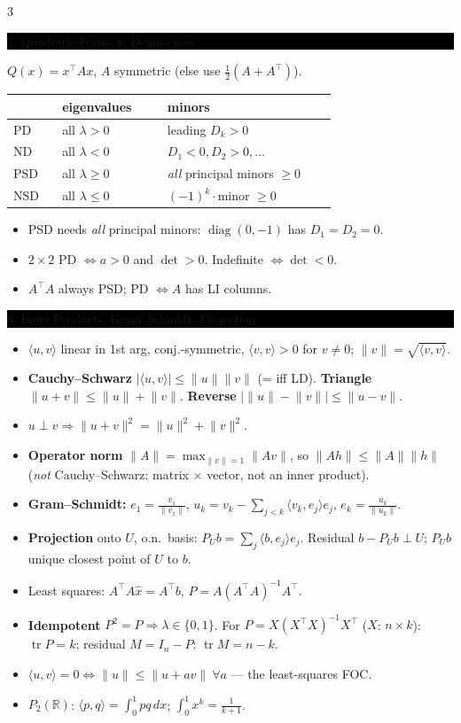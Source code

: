 \documentclass[8pt,letterpaper]{article}
\makeatletter
\newcommand{\sect}[1]{%
  \vspace{2.2pt}%
  \noindent\colorbox{black}{\parbox{\dimexpr\linewidth-2\fboxsep}{%
    \color{white}\bfseries\scshape\fontsize{6.4}{7.4}\selectfont
    \hyphenpenalty=10000\exhyphenpenalty=10000\raggedright #1}}%
  \vspace{1.4pt}\par\nopagebreak\@afterheading}
\newenvironment{tl}
  {\begin{itemize}[leftmargin=6pt,itemsep=0.3pt,topsep=1pt,parsep=0pt,
                   partopsep=0pt,label=\textcolor{gray}{\tiny$\bullet$}]}
  {\end{itemize}}
\newcommand{\R}{\mathbb{R}}
\newcommand{\tr}{\operatorname{tr}}
\newcommand{\tp}{^{\!\top}}
\newcommand{\ip}[2]{\langle #1,#2\rangle}
\newcommand{\nm}[1]{\lVert #1\rVert}
\makeatother
\begin{document}
\begin{multicols}{3}
\sect{5. Quadratic Forms \& Definiteness}
$Q(x)=x\tp Ax$, $A$ symmetric (else use $\tfrac12(A+A\tp)$).
\begin{center}\fontsize{5.9}{6.8}\selectfont
\begin{tabular}{@{}p{0.13\linewidth}p{0.28\linewidth}p{0.45\linewidth}@{}}
\hline
 & eigenvalues & minors\\ \hline
PD & all $\lambda>0$ & leading $D_k>0$\\
ND & all $\lambda<0$ & $D_1<0,D_2>0,\dots$\\
PSD & all $\lambda\ge0$ & \emph{all} principal minors $\ge0$\\
NSD & all $\lambda\le0$ & $(-1)^k\cdot$minor $\ge0$\\ \hline
\end{tabular}
\end{center}
\begin{tl}
\item \colorbox{black!12}{PSD needs \emph{all} principal minors}: $\operatorname{diag}(0,-1)$ has $D_1=D_2=0$.
\item $2\times2$ PD $\iff a>0$ and $\det>0$. Indefinite $\iff\det<0$.
\item $A\tp A$ always PSD; PD $\iff A$ has LI columns.
\end{tl}

\sect{6. Inner Products, Gram--Schmidt, Projection}
\begin{tl}
\item $\ip{u}{v}$ linear in 1st arg, conj.-symmetric, $\ip{v}{v}>0$ for $v\neq0$; $\nm{v}=\sqrt{\ip{v}{v}}$.
\item \textbf{Cauchy--Schwarz} $|\ip{u}{v}|\le\nm{u}\nm{v}$ (= iff LD). \textbf{Triangle} $\nm{u+v}\le\nm{u}+\nm{v}$. \textbf{Reverse} $\big|\nm{u}-\nm{v}\big|\le\nm{u-v}$.
\item $u\perp v\Rightarrow\nm{u+v}^2=\nm{u}^2+\nm{v}^2$.
\item \textbf{Operator norm} $\nm{A}=\max_{\nm{v}=1}\nm{Av}$, so $\nm{Ah}\le\nm{A}\nm{h}$ (\emph{not} Cauchy--Schwarz: matrix $\times$ vector, not an inner product).
\item \textbf{Gram--Schmidt:} $e_1=\frac{v_1}{\nm{v_1}}$, $u_k=v_k-\sum_{j<k}\ip{v_k}{e_j}e_j$, $e_k=\frac{u_k}{\nm{u_k}}$.
\item \textbf{Projection} onto $U$, o.n.\ basis: $P_Ub=\sum_j\ip{b}{e_j}e_j$. Residual $b-P_Ub\perp U$; $P_Ub$ unique closest point of $U$ to $b$.
\item Least squares: $A\tp A\hat x=A\tp b$, $P=A(A\tp A)^{-1}A\tp$.
\item \textbf{Idempotent} $P^2=P\Rightarrow\lambda\in\{0,1\}$. For $P=X(X\tp X)^{-1}X\tp$ ($X$: $n\times k$): $\tr P=k$; residual $M=I_n-P$: $\tr M=n-k$.
\item \textbf{$\ip{u}{v}=0\iff\nm{u}\le\nm{u+av}\ \forall a$} --- the least-squares FOC.
\item $P_2(\R)$: $\ip{p}{q}=\int_0^1pq\,dx$; $\int_0^1x^k=\frac{1}{k+1}$.
\end{tl}


\end{multicols}
\end{document}
